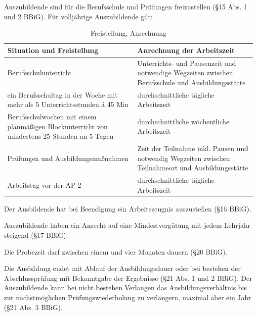 Auszubildende sind für die Berufsschule und Prüfungen freizustellen (§15 Abs. 1 und 2 BBiG). Für volljährige Auszubildende gilt:

\begin{table}[H]
    \centering
    \begin{tabularx}{\textwidth}{|>{\centering\arraybackslash}X|>{\centering\arraybackslash}X|}
        \hline
        Situation und Freistellung                                                                   & Anrechnung der Arbeitszeit                                                                          \\
        \hline
        Berufsschulunterricht                                                                        & Unterrichts- und Pausenzeit und notwendige Wegzeiten zwischen Berufsschule und Ausbildungsstätte    \\
        \hline
        ein Berufsschultag in der Woche mit mehr als 5 Unterrichtsstunden á 45 Min                   & durchschnittliche tägliche Arbeitszeit                                                              \\
        \hline
        Berufsschulwochen mit einem planmäßigen Blockunterricht von mindestens 25 Stunden an 5 Tagen & durchschnittliche wöchentliche Arbeitszeit                                                          \\
        \hline
        Prüfungen und Ausbildungsmaßnahmen                                                           & Zeit der Teilnahme inkl. Pausen und notwendig Wegzeiten zwischen Teilnahmeort und Ausbildungsstätte \\
        \hline
        Arbeitstag vor der AP 2                                                                      & durchschnittliche tägliche Arbeitszeit                                                              \\
        \hline
    \end{tabularx}
    \caption{Freistellung, Anrechnung}
    \label{tab:freistellung}
\end{table}

Der Ausbildende hat bei Beendigung ein Arbeitszeugnis auszustellen (§16 BBiG).

Auszubildende haben ein Anrecht auf eine Mindestvergütung mit jedem Lehrjahr steigend (§17 BBiG).

Die Probezeit darf zwischen einem und vier Monaten dauern (§20 BBiG).

Die Ausbildung endet mit Ablauf der Ausbildungsdauer oder bei bestehen der Abschlussprüfung mit Bekanntgabe der Ergebnisse (§21 Abs. 1 und 2 BBiG). Der Auszubildende kann bei nicht bestehen Verlangen das Ausbildungsverhältnis bis zur nächstmöglichen Prüfungswiederholung zu verlängern, maximal aber ein Jahr (§21 Abs. 3 BBiG).

